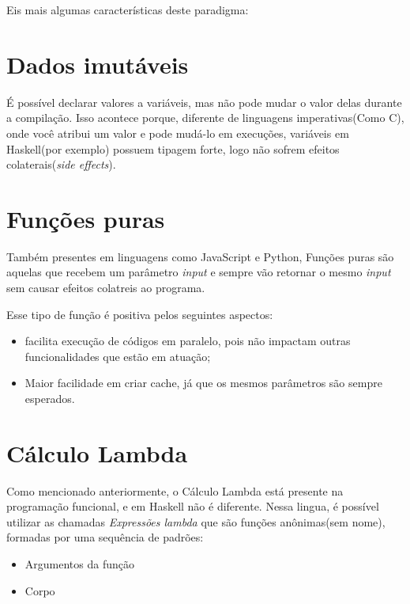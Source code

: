 \documentclass[
  12pt,				         %
  oneside,			       %
  a4paper,			       %
  english,		       	 %
  brazil,			      	 %
]{abntex2}
\begin{document}
    Eis mais algumas características deste paradigma:

    \section{Dados imutáveis} 

    É possível declarar valores a variáveis, mas não pode mudar o valor 
    delas durante a compilação. Isso acontece porque, diferente de linguagens imperativas(Como C), onde você
    atribui um valor e pode mudá-lo em execuções, variáveis em Haskell(por exemplo) possuem tipagem forte, logo 
    não sofrem efeitos colaterais(\emph{side effects}).

    \section{Funções puras}

    Também presentes em linguagens como JavaScript e Python, Funções puras são aquelas que recebem 
    um parâmetro \emph{input} e sempre vão retornar o mesmo \emph{input} sem causar efeitos colatreis
    ao programa.

    Esse tipo de função é positiva pelos seguintes aspectos:
    
    \begin{itemize}
      \item facilita execução de códigos em paralelo, pois não impactam outras funcionalidades que estão em atuação;
      \item Maior facilidade em criar cache, já que os mesmos parâmetros são sempre esperados.
    \end{itemize} 

    \newpage

    \section{Cálculo Lambda}
    
    Como mencionado anteriormente, o Cálculo Lambda está presente na programação funcional, e em Haskell não é diferente.
    Nessa lingua, é possível utilizar as chamadas \emph{Expressões lambda} que são funções anônimas(sem nome), formadas por 
    uma sequência de padrões:

    \begin{itemize}
      \item Argumentos da função
      \item Corpo
    \end{itemize}
\end{document}
